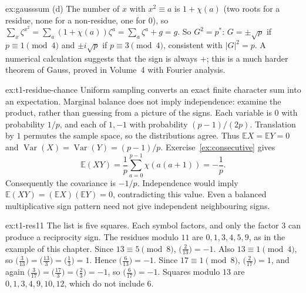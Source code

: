 \begin{solution}{ex:gausssum}
(d) The number of $x$ with $x^2\equiv a$ is $1+\chi(a)$ (two roots for a residue, none for a non-residue, one for $0$), so $\sum_x\zeta^{x^2}=\sum_a(1+\chi(a))\zeta^a=\sum_a\zeta^a+g=g$. So $G^2=p^*$: $G=\pm\sqrt p$ if $p\equiv1\pmod4$ and $\pm i\sqrt p$ if $p\equiv3\pmod4$, consistent with $|G|^2=p$. A numerical calculation suggests that the sign is always $+$; this is a much harder theorem of Gauss, proved in Volume~4 with Fourier analysis.
\end{solution}

\begin{solution}{ex:t1-residue-chance}
\idea Uniform sampling converts an exact finite character sum into an
expectation. Marginal balance does not imply independence: examine the
product, rather than guessing from a picture of the signs.
\writeup Each variable is $0$ with probability $1/p$, and each of $1,-1$
with probability $(p-1)/(2p)$. Translation by $1$ permutes the sample space,
so the distributions agree. Thus $\mathbb E X=\mathbb E Y=0$ and
$\operatorname{Var}(X)=\operatorname{Var}(Y)=(p-1)/p$.
Exercise~\ref{ex:consecutive} gives
\[
\mathbb E(XY)=\frac1p\sum_{a=0}^{p-1}\chi(a(a+1))=-\frac1p.
\]
Consequently the covariance is $-1/p$. Independence would imply
$\mathbb E(XY)=(\mathbb E X)(\mathbb E Y)=0$, contradicting this value. Even a balanced
multiplicative sign pattern need not give independent neighbouring signs.
\end{solution}

\begin{solution}{ex:t1-res11}
\idea The list is five squares. Each symbol factors, and only the factor $3$ can produce a reciprocity sign.
\writeup The residues modulo $11$ are $0,1,3,4,5,9$, as in the example of this chapter.
Since $13\equiv 5\pmod 8$, $\bigl(\frac{2}{13}\bigr)=-1$. Also $13\equiv 1\pmod 4$, so $\bigl(\frac{3}{13}\bigr)=\bigl(\frac{13}{3}\bigr)=\bigl(\frac{1}{3}\bigr)=1$. Hence $\bigl(\frac{6}{13}\bigr)=-1$.
Since $17\equiv 1\pmod 8$, $\bigl(\frac{2}{17}\bigr)=1$, and again $\bigl(\frac{3}{17}\bigr)=\bigl(\frac{17}{3}\bigr)=\bigl(\frac{2}{3}\bigr)=-1$, so $\bigl(\frac{6}{17}\bigr)=-1$.
Squares modulo $13$ are $0,1,3,4,9,10,12$, which do not include $6$.
\end{solution}

